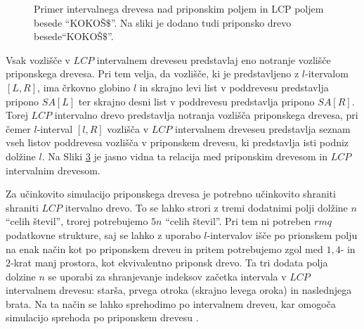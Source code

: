 \begin{figure}[htb]
    \begin{subfigure}[T]{0.45\linewidth}        
        
        \centering
        \subcaption*{}
        \label{fig:aSADrevo}
    \end{subfigure}
    \hspace{0.5cm}
    \begin{subfigure}[T]{0.45\linewidth}        
        
        \centering
        \subcaption*{}
        \label{fig:aSAPolje}
    \end{subfigure}

    \caption{Primer intervalnega drevesa nad priponskim poljem in LCP poljem besede \enquote{KOKOŠ$\$$}. Na sliki je dodano tudi priponsko drevo besede\enquote{KOKOŠ$\$$}.} 
    \label{fig:intervalTree}
\end{figure}

Vsak vozlišče v $LCP$ intervalnem dreveseu predstavlaj eno notranje vozlišče priponskega drevesa. Pri tem velja, da vozlišče, ki je predstavljeno z $l$-itervalom $[L,R]$, ima črkovno globino $l$ in skrajno levi list v poddrevesu predstavlja pripono $SA[L]$ ter skrajno desni list v poddrevesu predstavlja pripono $SA[R]$. Torej $LCP$ intervalno drevo predstavlja notranja vozlišča priponskega drevesa, pri čemer $l$-interval $[l,R]$ vozlišča v $LCP$ intervalnem dreveseu predstavlja seznam vseh listov poddrevesa vozlišča v priponskem drevesu, ki predstavlja isti podniz dolžine $l$. Na Sliki \ref{fig:intervalTree} je jasno vidna ta relacija med priponskim drevesom in $LCP$ intervalnim drevesom.

Za učinkovito simulacijo priponskega drevesa je potrebno učinkovito shraniti shraniti $LCP$ itervalno drevo. To se lahko strori z tremi dodatnimi polji dolžine $n$ \enquote{celih števil}, trorej potrebujemo $5n$ \enquote{celih števil}. Pri tem ni potreben $rmq$ podatkovne strukture, saj se lahko z uporabo $l$-intervalov išče po prionskem polju na enak način kot po priponskem dreveu in pritem potrebujemo zgol med $1,4$- in $2$-krat manj prostora, kot ekvivalentno priponsk drevo. Ta tri dodata polja dolzine $n$ se uporabi za shranjevanje indeksov začetka intervala v $LCP$ intervalnem drevesu: starša, prvega otroka (skrajno levega oroka) in naslednjega brata. Na ta način se lahko sprehodimo po intervalnem dreveu, kar omogoča simulacijo sprehoda po priponskem drevesu \cite{Abouelhoda2004}.

